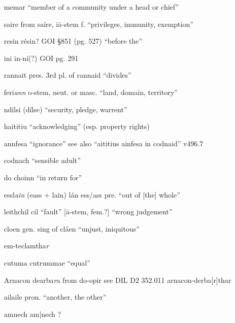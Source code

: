 \documentclass[11pt]{article}
\begin{document}
\begin{enumerate}
  \item[memar] \enquote{member of a community under a head or chief}

  \item[saire] from sa\'{i}re, i\={a}-stem f. \enquote{privileges, immunity, exemption}

  \item[resin] r\'{e}sin? GOI \S 851 (pg. 527) \enquote{before the}

  \item[ini] in-n\'{i}(?) GOI pg. 291

  \item[rannait] pres. 3rd pl. of rannaid \enquote{divides}

  \item[feri\emph{ann}] o-stem, neut. or masc. \enquote{land, domain, territory}

  \item[ndilsi] (d\'{i}lse) \enquote{security, pledge, warrent}

  \item[haititiu] \enquote{acknowledging} (esp. property rights)

  \item[annfesa] \enquote{ignorance} see also \enquote{aititius ainfesa in codnaid} v496.7

  \item[codnach] \enquote{sensible adult}

  \item[do choinn] \enquote{in return for}

  \item[essl\emph{ain}] (eass + lain) l\'{a}n ess/ass pre. \enquote{out of [the] whole}

  \item[leithchil] cil \enquote{fault} [\={a}-stem, fem.?] \enquote{wrong judgement}
  
  \item[cloen] gen. sing of cl\'{a}en \enquote{unjust, iniquitous}

  \item[em-teclamtha\emph{r}] 

  \item[cutuma] cutrummae \enquote{equal}

  \item[Arnacon dearba\emph{r}a] from do-opir see DIL D2 352.011 arnacon-derba[r]thar

  \item[ailaile] pron. \enquote{another, the other}

  \item[amnech] am|nech ?
\end{enumerate}
\end{document}
